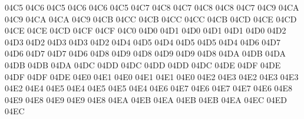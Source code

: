 \setcclcucx 04C5 04C6 04C5 %
\setcclcucx 04C6 04C6 04C5 %
\setcclcucx 04C7 04C8 04C7 %
\setcclcucx 04C8 04C8 04C7 %
\setcclcucx 04C9 04CA 04C9 %
\setcclcucx 04CA 04CA 04C9 %
\setcclcucx 04CB 04CC 04CB %
\setcclcucx 04CC 04CC 04CB %
\setcclcucx 04CD 04CE 04CD %
\setcclcucx 04CE 04CE 04CD %
\setcclcucx 04CF 04CF 04C0 %
\setcclcucx 04D0 04D1 04D0 %
\setcclcucx 04D1 04D1 04D0 %
\setcclcucx 04D2 04D3 04D2 %
\setcclcucx 04D3 04D3 04D2 %
\setcclcucx 04D4 04D5 04D4 %
\setcclcucx 04D5 04D5 04D4 %
\setcclcucx 04D6 04D7 04D6 %
\setcclcucx 04D7 04D7 04D6 %
\setcclcucx 04D8 04D9 04D8 %
\setcclcucx 04D9 04D9 04D8 %
\setcclcucx 04DA 04DB 04DA %
\setcclcucx 04DB 04DB 04DA %
\setcclcucx 04DC 04DD 04DC %
\setcclcucx 04DD 04DD 04DC %
\setcclcucx 04DE 04DF 04DE %
\setcclcucx 04DF 04DF 04DE %
\setcclcucx 04E0 04E1 04E0 %
\setcclcucx 04E1 04E1 04E0 %
\setcclcucx 04E2 04E3 04E2 %
\setcclcucx 04E3 04E3 04E2 %
\setcclcucx 04E4 04E5 04E4 %
\setcclcucx 04E5 04E5 04E4 %
\setcclcucx 04E6 04E7 04E6 %
\setcclcucx 04E7 04E7 04E6 %
\setcclcucx 04E8 04E9 04E8 %
\setcclcucx 04E9 04E9 04E8 %
\setcclcucx 04EA 04EB 04EA %
\setcclcucx 04EB 04EB 04EA %
\setcclcucx 04EC 04ED 04EC %
